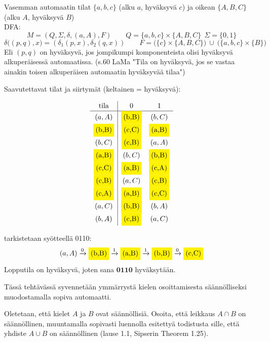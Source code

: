 \documentclass[12pt,a4paper]{article}
\begin{document}
Vasemman automaatin tilat
$\{a,b,c\}$ (alku $a$, hyväksyvä $c$) ja oikean 
$\{A,B,C\}$ (alku $A$, hyväksyvä $B$)\\

DFA:
\[
M=(Q,\Sigma,\delta,(a,A),F)\qquad
Q=\{a,b,c\}\times\{A,B,C\}\ \ \Sigma=\{0,1\}
\]
\[
\delta\big((p,q),x\big)=(\delta_1(p,x),\delta_2(q,x))\qquad
F=\big(\{c\}\times\{A,B,C\}\big)\ \cup\ \big(\{a,b,c\}\times\{B\}\big)
\]
Eli $(p,q)$ on hyväksyvä, jos jompikumpi komponenteista olisi hyväksyvä
alkuperäisessä automaatissa.
(s.60 LaMa "Tila on hyväksyvä, jos se vastaa ainakin toisen
alkuperäisen automaatin hyväksyvää tilaa")

\bigskip
Saavutettavat tilat ja siirtymät (keltainen = hyväksyvä):

\[
\renewcommand{\arraystretch}{1.15}
\begin{array}{c|cc}
\text{tila} & 0 & 1\\\hline
(a,A)            & \korostus{(b,B)} & (b,C) \\
\korostus{(b,B)} & \korostus{(c,C)} & \korostus{(a,B)} \\
(b,C)            & \korostus{(c,B)} & (a,A) \\
\korostus{(a,B)} & (b,C)            & \korostus{(b,B)} \\
\korostus{(c,C)} & \korostus{(a,B)} & \korostus{(c,A)} \\
\korostus{(c,B)} & (a,C)            & \korostus{(c,B)} \\
\korostus{(c,A)} & \korostus{(a,B)} & \korostus{(c,C)} \\
(a,C)            & \korostus{(b,B)} & (b,A) \\
(b,A)            & \korostus{(c,B)} & (a,C)
\end{array}
\]


\medskip
tarkistetaan syötteellä 0110:
\[
(a,A)\xrightarrow{0}\korostus{(b,B)}
\xrightarrow{1}\korostus{(a,B)}
\xrightarrow{1}\korostus{(b,B)}
\xrightarrow{0}\korostus{(c,C)}
\]
Lopputila on hyväksyvä, joten sana \(\mathbf{0110}\) hyväksytään. 





\pagebreak
{} Tässä tehtävässä syvennetään ymmärrystä kielen osoittamisesta säännölliseksi muodostamalla sopiva automaatti.
  
Oletetaan, että kielet $A$ ja $B$ ovat säännöllisiä.
Osoita, että leikkaus $A\cap B$ on säännöllinen, muuntamalla
sopivasti luennolla esitettyä todistusta sille, että
yhdiste $A\cup B$ on säännöllinen (lause 1.1, Sipserin Theorem 1.25).
\end{document}
